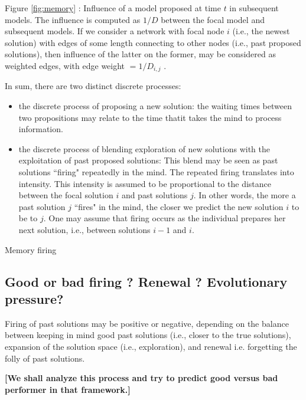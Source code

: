 Figure \ref{fig:memory} : Influence of a model proposed at time $t$ in subsequent models. The influence is computed as $1/D$ between the focal model and subsequent models. If we consider a network with focal node $i$ (i.e., the newest solution) with edges of some length connecting to other nodes (i.e., past proposed solutions), then influence of the latter on the former, may be considered as weighted edges, with edge weight $= 1/D_{i,j}$ .



In sum, there are two distinct discrete processes:

\begin{itemize}
  \item the discrete process of proposing a new solution: the waiting times between two propositions may relate to the time thatit takes the mind to process information.
  \item the discrete process of blending exploration of new solutions with the exploitation of past proposed solutions: This blend may be seen as past solutions ``firing" repeatedly in the mind. The repeated firing translates into intensity. This intensity is assumed to be proportional to the distance between the focal solution $i$ and past solutions $j$. In other words, the more a past solution $j$ ``fires" in the mind, the closer we predict the new solution $i$ to be to $j$. One may assume that firing occurs as the individual prepares her next solution, i.e., between solutions $i-1$ and $i$. \end{itemize}

Memory firing 


\subsection{Good or bad firing ? Renewal ? Evolutionary pressure?}
Firing of past solutions may be positive or negative, depending on the balance between keeping in mind good past solutions (i.e., closer to the true solutions), expansion of the solution space (i.e., exploration), and renewal i.e. forgetting the folly of past solutions. 

{\bf [We shall analyze this process and try to predict good versus bad performer in that framework.]}


